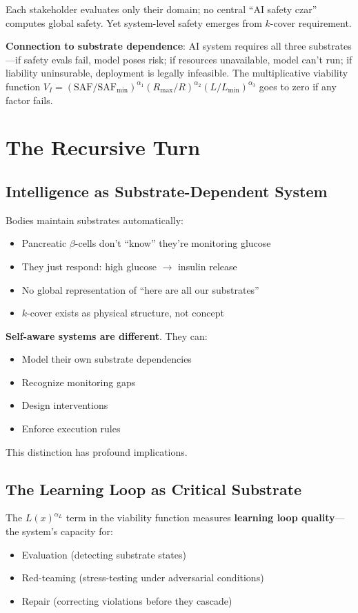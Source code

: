 \documentclass[11pt,a4paper]{article}
\theoremstyle{definition}
\begin{document}
Each stakeholder evaluates only their domain; no central ``AI safety czar'' computes global safety. Yet system-level safety emerges from $k$-cover requirement.

\textbf{Connection to substrate dependence}: AI system requires all three substrates---if safety evals fail, model poses risk; if resources unavailable, model can't run; if liability uninsurable, deployment is legally infeasible. The multiplicative viability function $V_I = (\text{SAF}/\text{SAF}_{\min})^{\alpha_1} (R_{\max}/R)^{\alpha_2} (L/L_{\min})^{\alpha_3}$ goes to zero if any factor fails.

\section{The Recursive Turn}

\subsection{Intelligence as Substrate-Dependent System}

Bodies maintain substrates automatically:
\begin{itemize}
\item Pancreatic $\beta$-cells don't ``know'' they're monitoring glucose
\item They just respond: high glucose $\to$ insulin release
\item No global representation of ``here are all our substrates''
\item $k$-cover exists as physical structure, not concept
\end{itemize}

\textbf{Self-aware systems are different}. They can:
\begin{itemize}
\item Model their own substrate dependencies
\item Recognize monitoring gaps
\item Design interventions
\item Enforce execution rules
\end{itemize}

This distinction has profound implications.

\subsection{The Learning Loop as Critical Substrate}

The $L(x)^{\alpha_L}$ term in the viability function measures \textbf{learning loop quality}---the system's capacity for:
\begin{itemize}
\item Evaluation (detecting substrate states)
\item Red-teaming (stress-testing under adversarial conditions)
\item Repair (correcting violations before they cascade)
\end{itemize}
\end{document}
